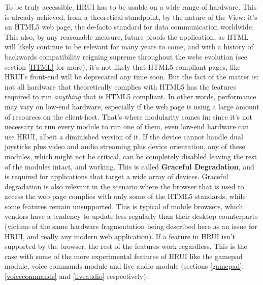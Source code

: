 To be truly accessible, HRUI has to be usable on a wide range of hardware. This is already achieved, from a theoretical 
standpoint, by the nature of the View: it's an HTML5 web page, the de-facto standard for data communication worldwide. This 
also, by any reasonable measure, future-proofs the application, as HTML will likely continue to be relevant for many years to 
come, and with a history of backwards compatibility reigning supreme throughout the webs evolution (see section \ref{HTML} for 
more), it's not likely that HTML5 compliant pages, like HRUI's front-end will be deprecated any time soon. But the fact of the 
matter is: not all hardware that theoretically complies with HTML5 has the features required to run \textit{anything} that is 
HTML5 compliant. In other words, performance may vary on low-end hardware, especially if the web page is using a large amount 
of resources on the client-host. That's where modularity comes in: since it's not necessary to run every module to run one of 
them, even low-end hardware can use HRUI, albeit a diminished version of it. If the device cannot handle dual joysticks plus 
video and audio streaming plus device orientation, any of these modules, which might not be critical, can be completely 
disabled leaving the rest of the modules intact, and working. This is called \textbf{Graceful Degradation}, and is required 
for applications that target a wide array of devices. Graceful degradation is also relevant in the scenario where the browser 
that is used to access the web page complies with only some of the HTML5 standards, while some features remain unsupported. 
This is typical of mobile browsers, which vendors have a tendency to update less regularly than their desktop counterparts 
(victims of the same hardware fragmentation being described here as an issue for HRUI, and really any modern web application). 
If a feature in HRUI isn't supported by the browser, the rest of the features work regardless. This is the case with some of 
the more experimental features of HRUI like the gamepad module, voice commands module and live audio module (sections 
\ref{gamepad}, \ref{voicecommands}  and \ref{liveaudio} respectively).\\

